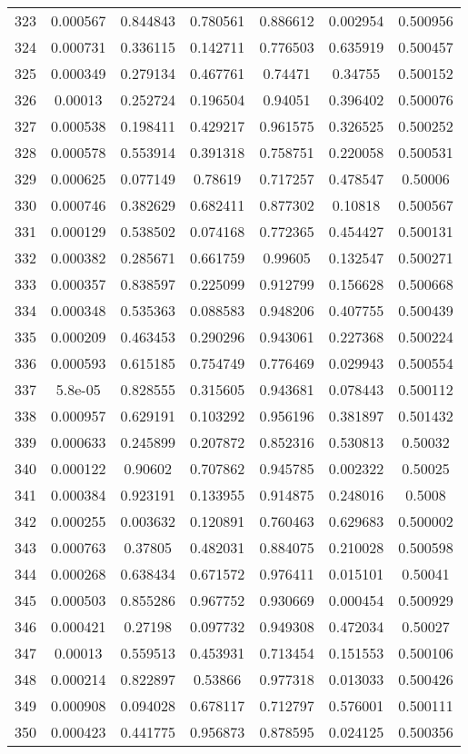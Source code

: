 \begin{table}
\begin{tabular}{c|c|c|c|c|c|c}
323 & 0.000567 & 0.844843 & 0.780561 & 0.886612 & 0.002954 & 0.500956\\
324 & 0.000731 & 0.336115 & 0.142711 & 0.776503 & 0.635919 & 0.500457\\
325 & 0.000349 & 0.279134 & 0.467761 & 0.74471 & 0.34755 & 0.500152\\
326 & 0.00013 & 0.252724 & 0.196504 & 0.94051 & 0.396402 & 0.500076\\
327 & 0.000538 & 0.198411 & 0.429217 & 0.961575 & 0.326525 & 0.500252\\
328 & 0.000578 & 0.553914 & 0.391318 & 0.758751 & 0.220058 & 0.500531\\
329 & 0.000625 & 0.077149 & 0.78619 & 0.717257 & 0.478547 & 0.50006\\
330 & 0.000746 & 0.382629 & 0.682411 & 0.877302 & 0.10818 & 0.500567\\
331 & 0.000129 & 0.538502 & 0.074168 & 0.772365 & 0.454427 & 0.500131\\
332 & 0.000382 & 0.285671 & 0.661759 & 0.99605 & 0.132547 & 0.500271\\
333 & 0.000357 & 0.838597 & 0.225099 & 0.912799 & 0.156628 & 0.500668\\
334 & 0.000348 & 0.535363 & 0.088583 & 0.948206 & 0.407755 & 0.500439\\
335 & 0.000209 & 0.463453 & 0.290296 & 0.943061 & 0.227368 & 0.500224\\
336 & 0.000593 & 0.615185 & 0.754749 & 0.776469 & 0.029943 & 0.500554\\
337 & 5.8e-05 & 0.828555 & 0.315605 & 0.943681 & 0.078443 & 0.500112\\
338 & 0.000957 & 0.629191 & 0.103292 & 0.956196 & 0.381897 & 0.501432\\
339 & 0.000633 & 0.245899 & 0.207872 & 0.852316 & 0.530813 & 0.50032\\
340 & 0.000122 & 0.90602 & 0.707862 & 0.945785 & 0.002322 & 0.50025\\
341 & 0.000384 & 0.923191 & 0.133955 & 0.914875 & 0.248016 & 0.5008\\
342 & 0.000255 & 0.003632 & 0.120891 & 0.760463 & 0.629683 & 0.500002\\
343 & 0.000763 & 0.37805 & 0.482031 & 0.884075 & 0.210028 & 0.500598\\
344 & 0.000268 & 0.638434 & 0.671572 & 0.976411 & 0.015101 & 0.50041\\
345 & 0.000503 & 0.855286 & 0.967752 & 0.930669 & 0.000454 & 0.500929\\
346 & 0.000421 & 0.27198 & 0.097732 & 0.949308 & 0.472034 & 0.50027\\
347 & 0.00013 & 0.559513 & 0.453931 & 0.713454 & 0.151553 & 0.500106\\
348 & 0.000214 & 0.822897 & 0.53866 & 0.977318 & 0.013033 & 0.500426\\
349 & 0.000908 & 0.094028 & 0.678117 & 0.712797 & 0.576001 & 0.500111\\
350 & 0.000423 & 0.441775 & 0.956873 & 0.878595 & 0.024125 & 0.500356\\
\end{tabular}
\end{table}
